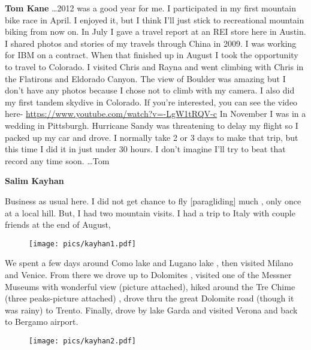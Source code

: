 \documentclass[10pt,a4paper]{article}
\begin{document}
\begin{multicols}{2}
\vspace{10pt}

\textbf{Tom Kane}
\dots 2012 was a good year for me. I participated in my first mountain bike race in April. I enjoyed it, but I think I'll just stick to recreational mountain biking from now on. In July I gave a travel report at an REI store here in Austin. I shared photos and stories of my travels through China in 2009.
    I was working for IBM on a contract. When that finished up in August I took the opportunity to travel to Colorado. I visited Chris and Rayna and went climbing with Chris in the Flatirons and Eldorado Canyon. The view of Boulder was amazing but I don't have any photos because I chose not to climb with my camera. I also did my first tandem skydive in Colorado. If you're interested, you can see the video here- \url{https://www.youtube.com/watch?v=-LgW1tRQV-c}
    In November I was in a wedding in Pittsburgh. Hurricane Sandy was threatening to delay my flight so I packed up my car and drove. I normally take 2 or 3 days to make that trip, but this time I did it in just under 30 hours. I don't imagine I'll try to beat that record any time soon.    \dots  Tom

\vspace{10pt}

\textbf{Salim Kayhan}




Business as usual here. I did not get chance to fly [paragliding] much , only once at a local hill.
But, I had two mountain visits. I had a trip to Italy with couple friends at the end of August,\begin{wrapfigure}{r}{0.7\linewidth}
	\vspace{-20pt}
	\begin{center}
		\texttt{[image: pics/kayhan1.pdf]}
	\end{center}
	\vspace{-20pt}
\end{wrapfigure}
We spent a few days around Como lake and Lugano lake ,  then visited Milano and Venice.
From there we drove up to Dolomites , visited one of the Messner Museums with wonderful view (picture attached), hiked around the Tre Chime (three peaks-picture attached) , drove thru the great Dolomite road (though it was rainy) to Trento. Finally, drove by lake Garda and visited Verona and back to Bergamo airport. 
\begin{wrapfigure}{l}{1.5\linewidth}
	\vspace{-20pt}
	\begin{center}
		\texttt{[image: pics/kayhan2.pdf]}
	\end{center}
	\vspace{-20pt}
\end{wrapfigure}



\end{multicols}
\end{document}
